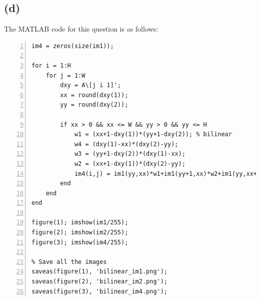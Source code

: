 \documentclass{article}
\begin{document}
\clearpage
\subsection*{(d)}

The MATLAB code for this question is as follows:
\begin{lstlisting}[frame=single,numbers=left,style=Matlab-Pyglike,breaklines=true,postbreak=\mbox{\textcolor{red}{$\hookrightarrow$}\space}]
im4 = zeros(size(im1));

for i = 1:H 
    for j = 1:W 
        dxy = A\[j i 1]'; 
        xx = round(dxy(1)); 
        yy = round(dxy(2)); 
        
        if xx > 0 && xx <= W && yy > 0 && yy <= H 
            w1 = (xx+1-dxy(1))*(yy+1-dxy(2)); % bilinear
            w4 = (dxy(1)-xx)*(dxy(2)-yy);
            w3 = (yy+1-dxy(2))*(dxy(1)-xx);
            w2 = (xx+1-dxy(1))*(dxy(2)-yy);
            im4(i,j) = im1(yy,xx)*w1+im1(yy+1,xx)*w2+im1(yy,xx+1)*w3+im1(yy+1,xx+1)*w4; 
        end
    end
end

figure(1); imshow(im1/255);
figure(2); imshow(im2/255);
figure(3); imshow(im4/255);

% Save all the images
saveas(figure(1), 'bilinear_im1.png');
saveas(figure(2), 'bilinear_im2.png');
saveas(figure(3), 'bilinear_im4.png');
\end{lstlisting}
\end{document}
